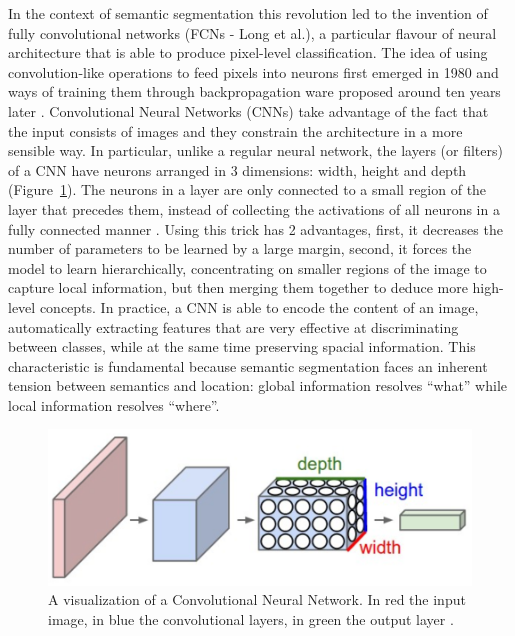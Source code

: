 \bigbreak
\noindent In the context of semantic segmentation this revolution led to the invention of fully convolutional networks (FCNs - Long et al.\cite{long2015fully}), a particular flavour of neural architecture that is able to produce pixel-level classification. The idea of using convolution-like operations to feed pixels into neurons first emerged in 1980 \cite{fukushima1980neocognitron} and ways of training them through backpropagation ware proposed around ten years later \cite{waibel1995phoneme}\cite{lecun1989backpropagation}.
Convolutional Neural Networks (CNNs) take advantage of the fact that the input consists of images and they constrain the architecture in a more sensible way. In particular, unlike a regular neural network, the layers (or filters) of a CNN have neurons arranged in 3 dimensions: width, height and depth (Figure~\ref{fig:conv-layer}). The neurons in a layer are only connected to a small region of the layer that precedes them, instead of collecting the activations of all neurons in a fully connected manner \cite{cnn-stanford}. Using this trick has 2 advantages, first, it decreases the number of parameters to be learned by a large margin, second, it forces the model to learn hierarchically, concentrating on smaller regions of the image to capture local information, but then merging them together to deduce more high-level concepts.
\bigbreak
\noindent In practice, a CNN is able to encode the content of an image, automatically extracting features that are very effective at discriminating between classes, while at the same time preserving spacial information. This characteristic is fundamental because semantic segmentation faces an inherent tension between semantics and location: global information resolves ``what'' while local information resolves ``where''\cite{long2015fully}.
\bigbreak
\begin{figure}[t]
    \centering
    \captionsetup{justification=centering}
    \includegraphics[width=\textwidth]{./pictures/conv-layer}
    \caption{A visualization of a Convolutional Neural Network. In red the input image, in blue the convolutional layers, in green the output layer \cite{cnn-stanford}.}
    \label{fig:conv-layer}
\end{figure}
